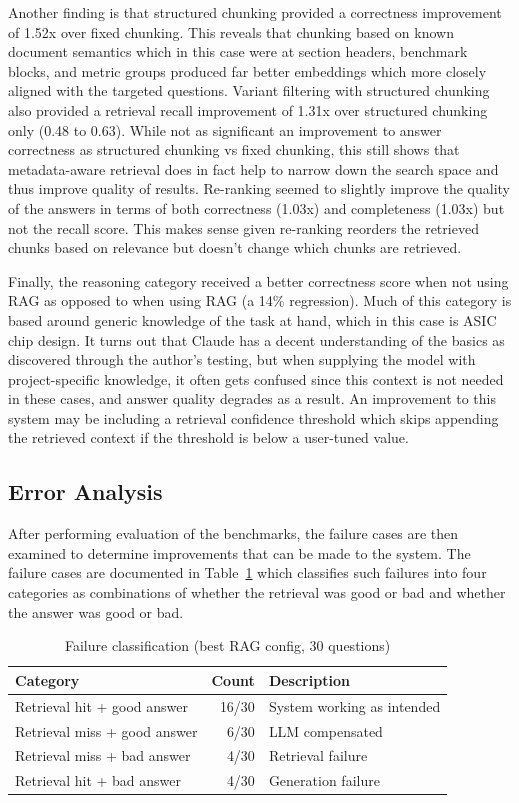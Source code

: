 \documentclass[conference]{IEEEtran}
\begin{document}
Another finding is that structured chunking provided a correctness improvement of 1.52x over fixed chunking. This reveals that chunking based on known document semantics which in this case were at section headers, benchmark blocks, and metric groups produced far better embeddings which more closely aligned with the targeted questions. Variant filtering with structured chunking also provided a retrieval recall improvement of 1.31x over structured chunking only (0.48 to 0.63). While not as significant an improvement to answer correctness as structured chunking vs fixed chunking, this still shows that metadata-aware retrieval does in fact help to narrow down the search space and thus improve quality of results. Re-ranking seemed to slightly improve the quality of the answers in terms of both correctness (1.03x) and completeness (1.03x) but not the recall score. This makes sense given re-ranking reorders the retrieved chunks based on relevance but doesn't change which chunks are retrieved.

Finally, the reasoning category received a better correctness score when not using RAG as opposed to when using RAG (a 14\% regression). Much of this category is based around generic knowledge of the task at hand, which in this case is ASIC chip design. It turns out that Claude has a decent understanding of the basics as discovered through the author's testing, but when supplying the model with project-specific knowledge, it often gets confused since this context is not needed in these cases, and answer quality degrades as a result. An improvement to this system may be including a retrieval confidence threshold which skips appending the retrieved context if the threshold is below a user-tuned value.

\subsection{Error Analysis}

After performing evaluation of the benchmarks, the failure cases are then examined to determine improvements that can be made to the system. The failure cases are documented in Table~\ref{tab:failure_classification} which classifies such failures into four categories as combinations of whether the retrieval was good or bad and whether the answer was good or bad.

\begin{table}[h]
\centering
\caption{Failure classification (best RAG config, 30 questions)}
\begin{tabular}{lrl}
\hline
\textbf{Category} & \textbf{Count} & \textbf{Description} \\
\hline
Retrieval hit + good answer  & 16/30 & System working as intended \\
Retrieval miss + good answer &  6/30 & LLM compensated \\
Retrieval miss + bad answer  &  4/30 & Retrieval failure \\
Retrieval hit + bad answer   &  4/30 & Generation failure \\
\hline
\end{tabular}
\label{tab:failure_classification}
\end{table}
\end{document}
